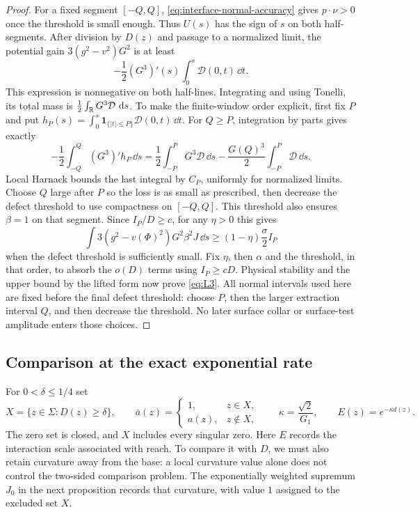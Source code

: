 \begin{proof}
For a fixed segment $[-Q,Q]$, \eqref{eq:interface-normal-accuracy}
gives $p\cdot\nu>0$ once the threshold is small enough.  Thus $U(s)$
has the sign of $s$ on both half-segments.  After division by $D(z)$
and passage to a normalized limit, the
potential gain $3(g^2-v^2)G^2$ is at least
\[
 -\frac12(G^3)'(s)\int_0^s\mathcal D(0,t)\,\dd t.
\]
This expression is nonnegative on both half-lines.  Integrating
and using Tonelli, its total mass is
$\tfrac12\int_\mathbb R G^3\mathcal D\,\,\mathrm d s$.
To make the finite-window order explicit, first fix $P$ and put
$h_P(s)=\int_0^s\mathbf1_{\{|t|\le P\}}\mathcal D(0,t)\,\dd t$.
For $Q\ge P$, integration by parts gives exactly
\[
 -\frac12\int_{-Q}^{Q}(G^3)'h_P\,\dd s
 =\frac12\int_{-P}^{P}G^3\mathcal D\,\dd s
       -\frac{G(Q)^3}{2}\int_{-P}^{P}\mathcal D\,\dd s.
\]
Local Harnack bounds the last integral by $C_P$, uniformly for
normalized limits.  Choose $Q$ large after $P$ so the loss is as
small as prescribed, then decrease the defect threshold to use
compactness on $[-Q,Q]$.  This threshold also ensures $\beta=1$
on that segment.  Since $I_P/D\ge c$, for any $\eta>0$ this gives
\[
 \int 3(g^2-v(\Phi)^2)G^2\beta^2J\,\dd s
       \ge(1-\eta)\frac\sigma2 I_P
\]
when the defect threshold is sufficiently small.  Fix $\eta$, then
$\alpha$ and the threshold, in that order, to absorb the $o(D)$ terms
using $I_P\ge cD$.  Physical stability and the upper bound by the
lifted form now prove \eqref{eq:L3}.
All normal intervals used here are fixed before the final defect
threshold: choose $P$, then the larger extraction interval $Q$, and
then decrease the threshold.  No later surface collar or surface-test
amplitude enters those choices.
\end{proof}

\subsection{Comparison at the exact exponential rate}

For $0<\delta\le1/4$ set
\[
 X=\{z\in\Sigma:D(z)\ge\delta\},\qquad
 \bar a(z)=\begin{cases}1,&z\in X,\\ a(z),&z\notin X,\end{cases}
 \qquad \kappa=\frac{\sqrt2}{G_1},\qquad E(z)=e^{-\kappa d(z)}.
\]
The zero set is closed, and $X$ includes every singular zero.
Here $E$ records the interaction scale associated with reach.  To compare
it with $D$, we must also retain curvature away from the base: a local
curvature value alone does not control the two-sided comparison problem.
The exponentially weighted supremum $J_0$ in the next proposition
records that curvature, with value $1$ assigned to the excluded set $X$.

